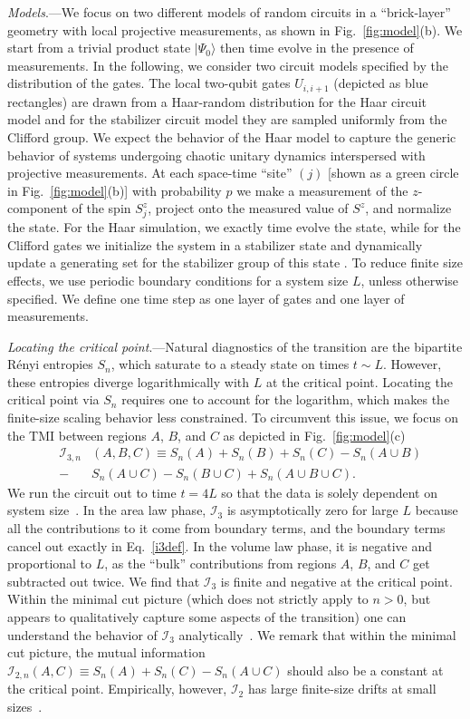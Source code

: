 \documentclass[prl,twocolumn,aps,showpacs,amsmath,amssymb,superscriptaddress,floatfix,longbibliography]{revtex4-1}
\begin{document}
\emph{Models}.---We focus on two different models of random circuits in a ``brick-layer'' geometry with local projective measurements, as shown in Fig.~\ref{fig:model}(b). We start from a trivial product state $|\Psi_0 \rangle$ then time evolve in the presence of measurements. In the following, we consider two circuit models specified by the distribution of the gates. The local two-qubit gates $U_{i,i+1}$ (depicted as blue rectangles) are drawn from a Haar-random distribution for the Haar circuit model and for the stabilizer circuit model they are sampled uniformly from the Clifford group.  We expect the behavior of the Haar model to capture the generic behavior of systems undergoing chaotic unitary dynamics interspersed with projective measurements.
At each space-time ``site'' $(j)$ [shown as a green circle in Fig.~\ref{fig:model}(b)] with probability $p$ we make a measurement of the $z$-component of the spin $S^z_j$, project onto the measured value of $S^z$, and normalize the state.  For the Haar simulation, we exactly time evolve the state, while for the Clifford gates we initialize the system in a stabilizer state and dynamically update a generating set for the stabilizer group of this state \cite{Aaronson04}. To reduce finite size effects, we use periodic boundary conditions for a system size $L$, unless otherwise specified. We define one time step as one layer of gates and one layer of measurements.

\emph{Locating the critical point}.---Natural diagnostics of the transition are the bipartite R\'enyi entropies $S_n$, which saturate to a steady state on times $t \sim L$.  However, these entropies diverge logarithmically with $L$ at the critical point. Locating the critical point via $S_n$ requires one to account for the logarithm, which makes the finite-size scaling behavior less constrained. To circumvent this issue, we focus on the TMI between regions $A$, $B$, and $C$ as depicted in Fig.~\ref{fig:model}(c) 
\begin{eqnarray}\label{i3def}
&\mathcal{I}_{3,n}&(A,B,C) \equiv S_n(A)+S_n(B)+S_n(C) - S_n(A\cup B)
\nonumber
\\
&-&S_n(A\cup C)-S_n(B\cup C)+S_n(A\cup B\cup C).
\end{eqnarray}
We run the circuit out to time $t=4L$  so that the data is solely dependent on system size~\cite{suppmat}. In the area law phase, $\mathcal{I}_3$ is asymptotically zero for large $L$ because all the contributions to it come from boundary terms, and the boundary terms cancel out exactly in Eq.~\eqref{i3def}. In the volume law phase, it is negative and proportional to $L$, as the ``bulk'' contributions from regions $A$, $B$, and $C$ get subtracted out twice.  We find that $\mathcal{I}_3$ is finite and negative at the critical point. Within the minimal cut picture 
(which does not strictly apply to $n>0$, but appears to qualitatively capture some aspects of the transition) 
one can understand the behavior of $\mathcal{I}_3$ analytically~\cite{suppmat}. We remark that within the minimal cut picture, the mutual information $\mathcal{I}_{2,n}(A, C) \equiv S_n(A) + S_n(C) - S_n(A \cup C)$ should also be a constant at the critical point. Empirically, however, $\mathcal{I}_2$ has large finite-size drifts at small sizes~\cite{suppmat}.
\end{document}
